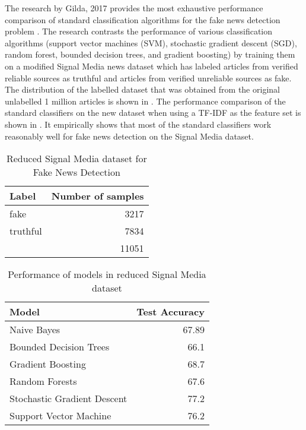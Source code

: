 The research by Gilda, 2017 provides the most exhaustive performance comparison of standard classification algorithms for the fake news detection problem \cite{gilda2017evaluating}. The research contrasts the performance of various classification algorithms  (support vector machines (SVM), stochastic gradient descent (SGD), random forest, bounded decision trees, and gradient boosting) by training them on a modified Signal Media news dataset \cite{corney2016million} which has labeled articles from verified reliable sources as truthful and articles from verified unreliable sources as fake. The distribution of the labelled dataset that was obtained from the original unlabelled 1 million articles is shown in . The performance comparison of the standard classifiers on the new dataset when using a TF-IDF as the feature set is shown in  \cite{gilda2017evaluating}. It empirically shows that most of the standard classifiers work reasonably well for fake news detection on the Signal Media dataset.

\begin{table}[h]
\begin{center}
\caption{Reduced Signal Media dataset for Fake News Detection}
\label{tbl:reduced_signal_media_dataset}
\begin{tabular}{lr}
\toprule 
Label&Number of samples \\
\midrule 
fake&3217 \\
truthful&7834 \\
\midrule
&11051 \\
\bottomrule
\end{tabular}
\end{center}
\end{table}

\begin{table}[h]
\begin{center}
\caption{Performance of models in reduced Signal Media dataset}
\label{tbl:signal_media_performance}
\begin{tabular}{lr}
\toprule 
Model&Test Accuracy\\
\midrule 
Naive Bayes&67.89\\
Bounded Decision Trees&66.1\\
Gradient Boosting&68.7\\
Random Forests&67.6\\
Stochastic Gradient Descent&77.2\\
Support Vector Machine&76.2\\
\bottomrule
\end{tabular}
\end{center}
\end{table}

